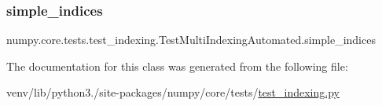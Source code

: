 \subsubsection{\texorpdfstring{simple\+\_\+indices}{simple\_indices}}
{\footnotesize\ttfamily numpy.\+core.\+tests.\+test\+\_\+indexing.\+Test\+Multi\+Indexing\+Automated.\+simple\+\_\+indices}



The documentation for this class was generated from the following file\+:\begin{DoxyCompactItemize}
\item 
venv/lib/python3./site-\/packages/numpy/core/tests/\hyperlink{test__indexing_8py}{test\+\_\+indexing.\+py}\end{DoxyCompactItemize}
